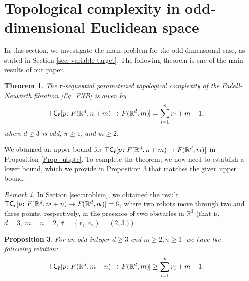 \documentclass[12pt,oneside,reqno]{amsart}
\theoremstyle{plain}
\newtheorem{theorem}{Theorem}[section]
\newtheorem{proposition}[theorem]{Proposition}
\theoremstyle{definition}
\theoremstyle{remark}
\newtheorem{remark}[theorem]{Remark}
\newcommand{\sect}{\setcounter{figure}{0}\section}
\newcommand{\TC}{{\sf {TC}}}
\newcommand{\br}{\bar{\mathbf{r}}}
\begin{document}
\sect{Topological complexity in odd-dimensional Euclidean space}\label{sec:odd}
In this section, we investigate the main problem for the odd-dimensional case, as stated in Section \ref{sec: variable target}.  The following theorem is one of the main results of our paper.
\begin{theorem}\label{Th_odd case}
The $\bar{\textbf{r}}$-sequential parametrized topological complexity of the Fadell-Neuwirth fibration \eqref{Eq_FNB} is given by $$\TC_{\br}[p\colon F(\mathbb{R}^d, n+ m) \to F(\mathbb{R}^d, m)] =\sum^{n}_{i=1} {r_i} + m -1,$$
where $d\geq 3$ is odd, $n\geq 1$, and $m\geq 2$.
\end{theorem}
We obtained an upper bound for $\TC_{\br}[p\colon F(\mathbb{R}^d, n+ m) \to F(\mathbb{R}^d, m)]$ in Proposition \ref{Prop_ubptc}. To complete the theorem, we now need to establish a lower bound, which we provide in Proposition \ref{Prop_odd lower bound} that matches the given upper bound.

\begin{remark}
In Section \ref{sec:problem}, we obtained the result $\TC_{\br}[p\colon F(\mathbb{R}^d, m+n)\to F(\mathbb{R}^d,m)]=6$, where two robots move through two and three points, respectively, in the presence of two obstacles in $\mathbb{R}^3$ (that is, $d=3, ~m = n =2, ~\br =(r_1, r_2)= (2,3))$. 
\end{remark}


\begin{proposition}\label{Prop_odd lower bound}
For an odd integer $d\geq 3$ and $m\geq 2, n\geq 1$, we have the following relation:  $$\TC_{\br}[p \colon F(\mathbb{R}^d, m+n)\to F(\mathbb{R}^d, m)] \geq \displaystyle\sum^{n}_{i=1} {r_i} + m -1.$$
\end{proposition}
\end{document}
